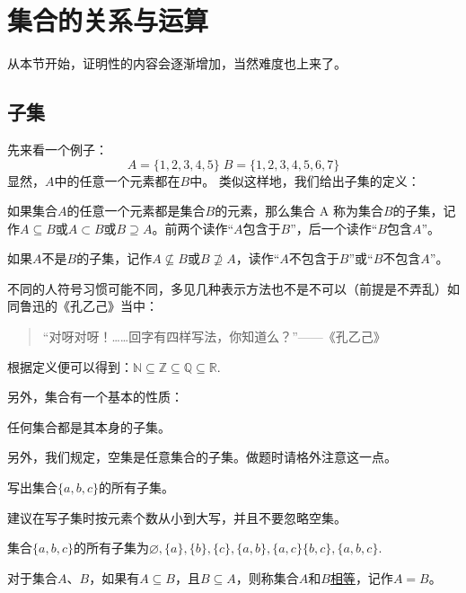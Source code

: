 \documentclass[lang=cn,math=cm,chinesefont=nofont,11pt,scheme=chinese,onecol]{elegantbook}
\begin{document}
\section{集合的关系与运算}
从本节开始，证明性的内容会逐渐增加，当然难度也上来了。
\subsection{子集}
先来看一个例子：$$A=\{1,2,3,4,5\}\;B=\{1,2,3,4,5,6,7\}$$
显然，$A$中的任意一个元素都在$B$中。
类似这样地，我们给出子集的定义：
\begin{definition}[子集]
  如果集合$A$的任意一个元素都是集合$B$的元素，那么集合 A 称为集合$B$的子集，记作$A\subseteq B$或$A\subset B$或$B\supseteq A$。前两个读作“$A$包含于$B$”，后一个读作“$B$包含$A$”。

  如果$A$不是$B$的子集，记作$A\nsubseteq B$或$B\nsupseteq A$，读作“$A$不包含于$B$”或“$B$不包含$A$”。
\end{definition}
不同的人符号习惯可能不同，多见几种表示方法也不是不可以（前提是不弄乱）如同鲁迅的《孔乙己》当中：
\begin{quotation}
  “对呀对呀！……回字有四样写法，你知道么？”——《孔乙己》
\end{quotation}

根据定义便可以得到：$\mathbb{N}\subseteq\mathbb{Z}\subseteq\mathbb{Q}\subseteq\mathbb{R}$.

  另外，集合有一个基本的性质：
\begin{property}
  任何集合都是其本身的子集。
\end{property}

另外，我们规定，空集是任意集合的子集。做题时请格外注意这一点。

\begin{example}
  写出集合$\{a,b,c\}$的所有子集。
\end{example}
\begin{remark}
  建议在写子集时按元素个数从小到大写，并且不要忽略空集。
\end{remark}
\begin{solution}
  集合$\{a,b,c\}$的所有子集为$\varnothing ,\{a\},\{b\},\{c\},\{a,b\},\{a,c\}\{b,c\},\{a,b,c\}$.
\end{solution}
\begin{definition}[集合的相等]
  对于集合$A$、$B$，如果有$A\subseteq B$，且$B\subseteq A$，则称集合$A$和$B$\underline{相等}，记作$A=B$。
\end{definition}
\end{document}
